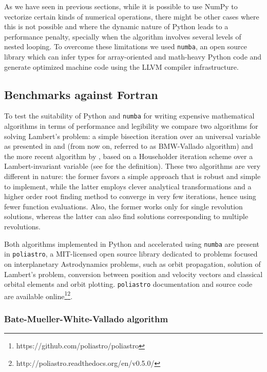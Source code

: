 As we have seen in previous sections, while it is possible to use NumPy to vectorize certain kinds of numerical operations, there might be other cases where this is not possible and where the dynamic nature of Python leads to a performance penalty, specially when the algorithm involves several levels of nested looping. To overcome these limitations we used \verb|numba|, an open source library which can infer types for array-oriented and math-heavy Python code and generate optimized machine code using the LLVM compiler infrastructure\cite{numba}.

\subsection{Benchmarks against Fortran}

To test the suitability of Python and \verb|numba| for writing expensive mathematical algorithms in terms of performance and legibility we compare two algorithms for solving Lambert's problem: a simple bisection iteration over an universal variable as presented in \cite{bate1971fundamentals} and \cite{vallado2001fundamentals} (from now on, referred to as BMW-Vallado algorithm) and the more recent algorithm by \cite{Izzo2014}, based on a Householder iteration scheme over a Lambert-invariant variable (see \cite{gooding1990procedure} for the definition). These two algorithms are very different in nature: the former favors a simple approach that is robust and simple to implement, while the latter employs clever analytical transformations and a higher order root finding method to converge in very few iterations, hence using fewer function evaluations. Also, the former works only for single revolution solutions, whereas the latter can also find solutions corresponding to multiple revolutions.


Both algorithms implemented in Python and accelerated using \verb|numba| are present in \verb|poliastro|, a MIT-licensed open source library dedicated to problems focused on interplanetary Astrodynamics problems, such as orbit propagation, solution of Lambert's problem, conversion between position and velocity vectors and classical orbital elements and orbit plotting. \verb|poliastro| documentation and source code are available online\footnote{https://github.com/poliastro/poliastro}\footnote{http://poliastro.readthedocs.org/en/v0.5.0/}.

\subsubsection{Bate-Mueller-White-Vallado algorithm}

